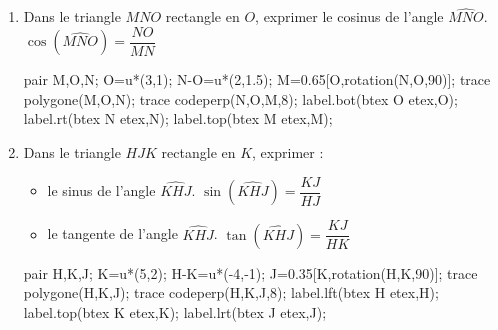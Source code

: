 \begin{corrige}
    \phantom{rrr}    

    \begin{enumerate}
        \item Dans le triangle $MNO$ rectangle en $O$, exprimer le cosinus de l'angle $\widehat{MNO}$. {\red $\cos(\widehat{MNO})=\dfrac{NO}{MN}$}
        
        \medskip
        \begin{Geometrie}[CoinHD={(6u,4.5u)}]        
            pair M,O,N;
            O=u*(3,1);
            N-O=u*(2,1.5);
            M=0.65[O,rotation(N,O,90)];
            trace polygone(M,O,N);            
            trace codeperp(N,O,M,8);
            label.bot(btex O etex,O);
            label.rt(btex N etex,N);
            label.top(btex M etex,M);
        \end{Geometrie}
        \item Dans le triangle $HJK$ rectangle en $K$, exprimer :
        \begin{itemize}
            \item le sinus de l'angle $\widehat{KHJ}$. {\red $\sin(\widehat{KHJ})=\dfrac{KJ}{HJ}$}
            \item le tangente de l'angle $\widehat{KHJ}$. {\red $\tan(\widehat{KHJ})=\dfrac{KJ}{HK}$}
        \end{itemize}
        
        \medskip
        \begin{Geometrie}[CoinHD={(6u,4.5u)}]        
            pair H,K,J;
            K=u*(5,2);
            H-K=u*(-4,-1);
            J=0.35[K,rotation(H,K,90)];
            trace polygone(H,K,J);            
            trace codeperp(H,K,J,8);
            label.lft(btex H etex,H);
            label.top(btex  K etex,K);
            label.lrt(btex J etex,J);
        \end{Geometrie}
    \end{enumerate}
\end{corrige}

